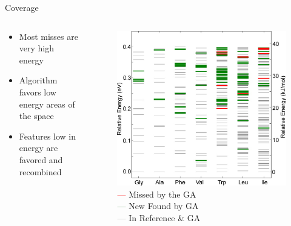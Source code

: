 \documentclass[10pt]{beamer}
\begin{document}
{{{%
\begin{frame}{Coverage}
	\begin{columns}[c] %
		\begin{column}{.4\textwidth}
			\begin{itemize}[<+->]
				\item {Most misses are very high energy}
				\item {Algorithm favors low energy areas of the space}
				\item {Features low in energy are favored and recombined}
			\end{itemize}
		\end{column}
		\hfill
		\begin{column}{0.6\textwidth}
			\begin{figure}
				\includegraphics[width=0.75\linewidth]{images/Supady5.png}
				\caption*{\textcolor{red}{---} Missed by the GA \\
				  \textcolor{darkgreen}{---} New Found by GA \\
				  \textcolor{gray}{---} In Reference \& GA}
			\end{figure}
		\end{column}
	\end{columns}
\end{frame}
}

}}
\end{document}
